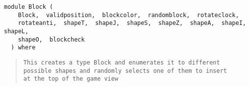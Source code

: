\label{module:Block}
\haddockbeginheader
{\haddockverb\begin{verbatim}
module Block (
    Block,  validposition,  blockcolor,  randomblock,  rotateclock, 
    rotateanti,  shapeT,  shapeJ,  shapeS,  shapeZ,  shapeA,  shapeI,  shapeL, 
    shapeO,  blockcheck
  ) where\end{verbatim}}
\haddockendheader

\begin{quote}
{\haddockverb\begin{verbatim}
This creates a type Block and enumerates it to different possible shapes and randomly selects one of them to insert 
at the top of the game view\end{verbatim}}
\end{quote}

